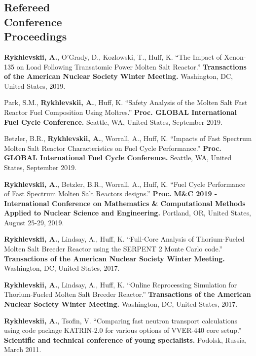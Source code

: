 \documentclass[margin,line]{resume}
\begin{document}
\begin{resume}
    \section{\mysidestyle Refereed\\Conference\\Proceedings}
    \begin{bibenum}
     \item \textbf{Rykhlevskii, A.}, O'Grady, D., Kozlowski, T., Huff, K. 
     ``The Impact of Xenon-135 on Load Following Transatomic Power Molten Salt 
     Reactor.'' \textbf{Transactions of the American Nuclear Society Winter 
     Meeting.} Washington, DC, United States, 2019.
     \item Park, S.M., \textbf{Rykhlevskii, A.}, Huff, K. 
	``Safety Analysis of the Molten Salt Fast Reactor Fuel Composition Using 
	Moltres.'' \textbf{Proc. GLOBAL International Fuel Cycle Conference.} Seattle, WA, United States, September 2019.    
     \item Betzler, B.R., \textbf{Rykhlevskii, A.}, Worrall, A., Huff, K. 
     ``Impacts of Fast Spectrum Molten Salt Reactor Characteristics on Fuel 
     Cycle Performance.'' \textbf{Proc. GLOBAL International Fuel Cycle 
     Conference.} Seattle, WA, United States, September 2019.    
    \item \textbf{Rykhlevskii, A.}, Betzler, B.R., Worrall, A., Huff, K. ``Fuel Cycle Performance of Fast Spectrum Molten Salt Reactors designs.'' \textbf{Proc. M\&C 2019 - International Conference on Mathematics \& Computational Methods Applied to Nuclear Science and Engineering.} 
            Portland, OR, United States, August 25-29, 2019.    
    \item \textbf{Rykhlevskii, A.}, Lindsay, A., Huff, K. ``Full-Core Analysis of Thorium-Fueled Molten Salt Breeder Reactor using the SERPENT 2 Monte Carlo code.'' 
            \textbf{Transactions of the American Nuclear Society Winter Meeting.} 
            Washington, DC, United States, 2017.
    \item \textbf{Rykhlevskii, A.}, Lindsay, A., Huff, K. ``Online Reprocessing Simulation for Thorium-Fueled Molten Salt Breeder Reactor.'' 
            \textbf{Transactions of the American Nuclear Society Winter Meeting.} 
            Washington, DC, United States, 2017.
      \item \textbf{Rykhlevskii, A.}, Tsofin, V. ``Comparing fast neutron transport calculations using code package KATRIN-2.0 for various options of VVER-440 core setup.''
         \textbf{Scientific and technical conference of young specialists.}
         Podolsk, Russia, March 2011.
	\end{bibenum}

\end{resume}
\end{document}
